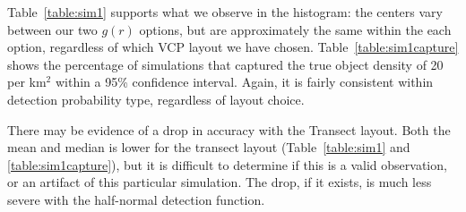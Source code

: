 \documentclass[12pt]{article}
\begin{document}
Table~\ref{table:sim1} supports what we observe in the histogram: the centers vary between our two $g(r)$ options, but are approximately the same within the each option, regardless of which VCP layout we have chosen. Table~\ref{table:sim1capture} shows the percentage of simulations that captured the true object density of 20 per km$^2$ within a 95\% confidence interval. \parencite{quang1993} Again, it is fairly consistent within detection probability type, regardless of layout choice.

There may be evidence of a drop in accuracy with the Transect layout. Both the mean and median is lower for the transect layout (Table~\ref{table:sim1} and \ref{table:sim1capture}), but it is difficult to determine if this is a valid observation, or an artifact of this particular simulation. The drop, if it exists, is much less severe with the half-normal detection function. 
\end{document}

